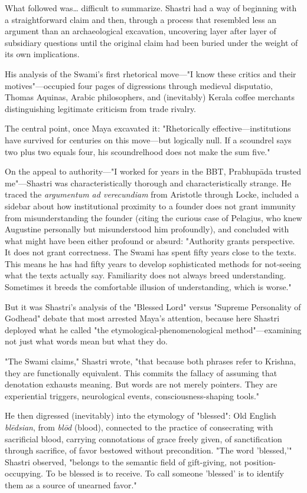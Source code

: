 \documentclass[12pt,twoside]{book}
\begin{document}
What followed was\ldots{} difficult to summarize. Shastri had a way of beginning with a straightforward claim and then, through a process that resembled less an argument than an archaeological excavation, uncovering layer after layer of subsidiary questions until the original claim had been buried under the weight of its own implications.

His analysis of the Swami's first rhetorical move—"I know these critics and their motives"—occupied four pages of digressions through medieval disputatio, Thomas Aquinas, Arabic philosophers, and (inevitably) Kerala coffee merchants distinguishing legitimate criticism from trade rivalry.

The central point, once Maya excavated it: "Rhetorically effective—institutions have survived for centuries on this move—but logically null. If a scoundrel says two plus two equals four, his scoundrelhood does not make the sum five."

On the appeal to authority—"I worked for years in the BBT, Prabhupāda trusted me"—Shastri was characteristically thorough and characteristically strange. He traced the \emph{argumentum ad verecundiam} from Aristotle through Locke, included a sidebar about how institutional proximity to a founder does not grant immunity from misunderstanding the founder (citing the curious case of Pelagius, who knew Augustine personally but misunderstood him profoundly), and concluded with what might have been either profound or absurd: "Authority grants perspective. It does not grant correctness. The Swami has spent fifty years close to the texts. This means he has had fifty years to develop sophisticated methods for not-seeing what the texts actually say. Familiarity does not always breed understanding. Sometimes it breeds the comfortable illusion of understanding, which is worse."

But it was Shastri's analysis of the "Blessed Lord" versus "Supreme Personality of Godhead" debate that most arrested Maya's attention, because here Shastri deployed what he called "the etymological-phenomenological method"—examining not just what words mean but what they do.

"The Swami claims," Shastri wrote, "that because both phrases refer to Krishna, they are functionally equivalent. This commits the fallacy of assuming that denotation exhausts meaning. But words are not merely pointers. They are experiential triggers, neurological events, consciousness-shaping tools."

He then digressed (inevitably) into the etymology of "blessed": Old English \emph{blēdsian}, from \emph{blōd} (blood), connected to the practice of consecrating with sacrificial blood, carrying connotations of grace freely given, of sanctification through sacrifice, of favor bestowed without precondition. "The word 'blessed,'" Shastri observed, "belongs to the semantic field of gift-giving, not position-occupying. To be blessed is to receive. To call someone 'blessed' is to identify them as a source of unearned favor."
\end{document}
